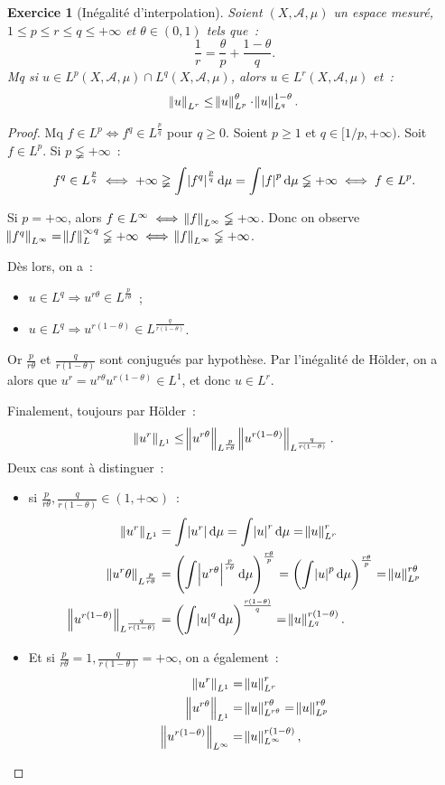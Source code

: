 \documentclass{article}
\newtheorem{ex}{Exercice}[section]
\theoremstyle{definition}
\newcommand{\pinfty}{{+\infty}}
\begin{document}
\begin{ex}[Inégalité d'interpolation] Soient $(X, \mathcal A, \mu)$ un espace mesuré, $1 \leq p \leq r \leq q \leq \pinfty$ et $\theta \in (0, 1)$ tels que~:
\[\frac 1r = \frac \theta p + \frac {1-\theta}q.\]
Mq si $u \in L^p(X, \mathcal A, \mu) \cap L^q(X, \mathcal A, \mu)$, alors $u \in L^r(X, \mathcal A, \mu)$ et~:
\[\norm u_{L^r} \leq \norm u_{L^p}^\theta \cdot \norm u_{L^q}^{1-\theta}.\]
\end{ex}

\begin{proof} Mq $f \in L^p \iff f^q \in L^{\frac pq}$ pour $q \geq 0$. Soient $p \geq 1$ et $q \in [1/p, \pinfty)$. Soit $f \in L^p$. Si $p \lneqq \pinfty$~:
\[f^q \in L^{\frac pq} \iff \pinfty \gneqq \int \abs {f^q}^{\frac pq}\dif\mu = \int \abs {f}^p\dif\mu \lneqq \pinfty \iff f \in L^p.\]

Si $p = \pinfty$, alors $f \in L^\infty \iff \norm f_{L^\infty} \lneqq \pinfty$. Donc on observe
$\norm {f^q}_{L^\infty} = {\norm f_L^\infty}^q \lneqq \pinfty \iff \norm f_{L^\infty} \lneqq \pinfty$.

Dès lors, on a~:
\begin{itemize}
	\item $u \in L^q \Rightarrow u^{r\theta} \in L^{\frac p{r\theta}}$~;
	\item $u \in L^q \Rightarrow u^{r(1-\theta)} \in L^{\frac q{r(1-\theta)}}$.
\end{itemize}

Or $\frac p{r\theta}$ et $\frac q{r(1-\theta)}$ sont conjugués par hypothèse. Par l'inégalité de Hölder, on a alors que $u^r = u^{r\theta}u^{r(1-\theta)} \in L^1$, et donc
$u \in L^r$.

Finalement, toujours par Hölder~:
\[\norm {u^r}_{L^1} \leq \norm {u^{r\theta}}_{L^{\frac p{r\theta}}}\norm {u^{r(1-\theta)}}_{L^{\frac q{r(1-\theta)}}}.\]
Deux cas sont à distinguer~:
\begin{itemize}
	\item si $\frac p{r\theta}, \frac q{r(1-\theta)} \in (1, \pinfty)$~:
	\begin{align*}
		\norm {u^r}_{L^1} &= \int \abs {u^r}\dif\mu = \int\abs u^r\dif\mu = \norm u_{L^r}^r \\
		\norm {u^r\theta}_{L^{\frac p{r\theta}}} &= \left(\int\abs {{u}^{r\theta}}^{\frac p{r\theta}}\dif\mu\right)^{\frac {r\theta}p} = \left(\int\abs u^p\dif\mu\right)^{\frac {r\theta}p}
			= \norm u_{L^p}^{r\theta} \\
		\norm {u^{r(1-\theta)}}_{L^{\frac q{r(1-\theta)}}} &= \left(\int\abs u^q\dif\mu\right)^{\frac {r(1-\theta)}q} = \norm u_{L^q}^{r(1-\theta)}.
	\end{align*}
	\item Et si $\frac p{r\theta} = 1, \frac q{r(1-\theta)} = \pinfty$, on a également~:
	\begin{align*}
		\norm {u^r}_{L^1} &= \norm u_{L^r}^r \\
		\norm {u^{r\theta}}_{L^1} &= \norm u_{L^{r\theta}}^{r\theta} = \norm u_{L^p}^{r\theta} \\
		\norm {u^{r(1-\theta)}}_{L^\infty} &= \norm u_{L^\infty}^{r(1-\theta)},
	\end{align*}
\end{itemize}


\end{proof}
\end{document}
